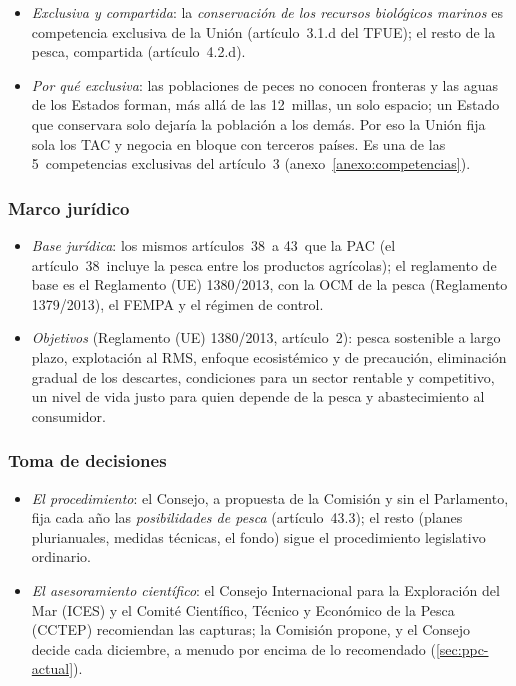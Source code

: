 \documentclass[11pt]{article}
\begin{document}
\begin{itemize}
\item \emph{Exclusiva y compartida}: la \emph{conservación de los recursos biológicos marinos} es competencia exclusiva de la Unión (artículo~3.1.d del TFUE); el resto de la pesca, compartida (artículo~4.2.d)\nocite{UE2016TFUE}.
\item \emph{Por qué exclusiva}: las poblaciones de peces no conocen fronteras y las aguas de los Estados forman, más allá de las 12~millas, un solo espacio; un Estado que conservara solo dejaría la población a los demás. Por eso la Unión fija sola los TAC y negocia en bloque con terceros países. Es una de las 5~competencias exclusivas del artículo~3 (anexo~\ref{anexo:competencias}).
\end{itemize}

\subsubsection{Marco jurídico}\label{sec:marco-ppc}

\begin{itemize}
\item \emph{Base jurídica}: los mismos artículos~38~a 43~que la PAC (el artículo~38~incluye la pesca entre los productos agrícolas); el reglamento de base es el Reglamento (UE) 1380/2013, con la OCM de la pesca (Reglamento 1379/2013), el FEMPA y el régimen de control\nocite{UE2013PPC}.
\item \emph{Objetivos} (Reglamento (UE) 1380/2013, artículo~2): pesca sostenible a largo plazo, explotación al RMS, enfoque ecosistémico y de precaución, eliminación gradual de los descartes, condiciones para un sector rentable y competitivo, un nivel de vida justo para quien depende de la pesca y abastecimiento al consumidor\nocite{UE2013PPC}.
\end{itemize}

\subsubsection{Toma de decisiones}\label{sec:decision-ppc}

\begin{itemize}
\item \emph{El procedimiento}: el Consejo, a propuesta de la Comisión y sin el Parlamento, fija cada año las \emph{posibilidades de pesca} (artículo~43.3); el resto (planes plurianuales, medidas técnicas, el fondo) sigue el procedimiento legislativo ordinario.
\item \emph{El asesoramiento científico}: el Consejo Internacional para la Exploración del Mar (ICES) y el Comité Científico, Técnico y Económico de la Pesca (CCTEP) recomiendan las capturas; la Comisión propone, y el Consejo decide cada diciembre, a menudo por encima de lo recomendado (\ref{sec:ppc-actual}).
\end{itemize}
\end{document}
